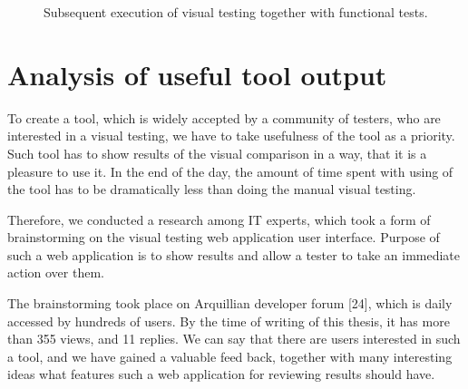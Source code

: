 \documentclass[11pt,oneside,final]{fithesis2}
\begin{document}
  \begin{figure}[!htb]
    \begin{center}
    \leavevmode
    \centerline{}
    \end{center}
    \caption{Subsequent execution of visual testing together with functional tests.}
    \label{fig:NextTestsRunsBMPN}
  \end{figure}
  
  \newpage
  \section{Analysis of useful tool output}
  \label{sec:analysisUsefulOutput}
  To create a tool, which is widely accepted by a community of testers, who are interested in a visual testing, we have to take usefulness of the tool as a priority. Such tool has to show results
  of the visual comparison in a way, that it is a pleasure to use it. In the end of the day, the amount of time spent with using of the tool has to be dramatically less than doing the manual
  visual testing.
   
  Therefore, we conducted a research among IT experts, which took a form of brainstorming on the visual testing web application user interface. Purpose of such a web application is to show
  results and allow a tester to take an immediate action over them.
  
  The brainstorming took place on Arquillian developer forum [24], which is daily accessed by hundreds of users. By the time of writing of this thesis, it has more than 355 views, 
  and 11 replies. We can say that there are users interested in such a tool, and we have gained a valuable feed back, together with many interesting ideas what features such a web application
  for reviewing results should have.
  
\end{document}
